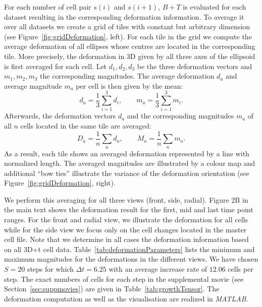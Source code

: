 \documentclass[11pt,a4paper, final]{article}
\begin{document}
For each number of cell pair $s(i)$ and $s(i+1)$, $B+T$ is evaluated for each dataset resulting in the corresponding deformation information. To average it over all datasets we create a grid of tiles with constant but arbitrary dimension (see Figure~\ref{fig:gridDeformation}, left). For each tile in the grid we compute the average deformation of all ellipses whose centres are located in the corresponding tile. More precisely, the deformation in 3D given by all three axes of the ellipsoid is first averaged for each cell. Let $d_1, d_2, d_3$ be the three deformation vectors and $m_1, m_2, m_3$ the corresponding magnitudes. The average deformation $d_a$ and average magnitude $m_a$ per cell is then given by the mean:
\begin{equation}
d_a = \frac{1}{3} \sum_{i=1}^{3} d_i, \qquad m_a = \frac{1}{3} \sum_{i=1}^{3} m_i.
\end{equation}
Afterwards, the deformation vectors $d_a$ and the corresponding magnitudes $m_a$ of all $n$ cells located in the same tile are averaged:
\begin{equation}
D_a = \frac{1}{n} \sum_{n} d_a, \qquad M_a = \frac{1}{n} \sum_{n} m_a.
\end{equation}
As a result, each tile shows an averaged deformation represented by a line with normalized length. The averaged magnitudes are illustrated by a colour map and additional ``bow ties'' illustrate the variance of the deformation orientation (see Figure~\ref{fig:gridDeformation}, right).

We perform this averaging for all three views (front, side, radial). Figure 2B in the main text shows the deformation result for the first, mid and last time point ranges. For the front and radial view, we illustrate the deformation for all cells while for the side view we focus only on the cell changes located in the master cell file. Note that we determine in all cases the deformation information based on all 3D+t cell data. Table~\ref{tab:deformationParameters} lists the minimum and maximum magnitudes for the deformations in the different views. We have chosen $S=20$ steps for which $\Delta t = 6.25$ with an average increase rate of $12.06$ cells per step. The exact numbers of cells for each step in the supplemental movie (see Section~\ref{sec:suppmovies}) are given in Table~\ref{tab:growthTensor}. The deformation computation as well as the visualisation are realized in \textit{MATLAB}.

\clearpage
\end{document}
